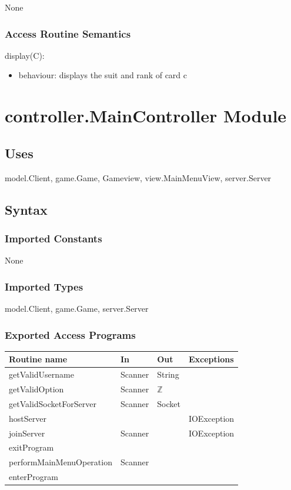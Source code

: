 \documentclass[12pt, titlepage]{article}
\begin{document}
None

\subsubsection* {Access Routine Semantics}

\noindent display(C):
\begin{itemize}
\item behaviour: displays the suit and rank of card c
\end{itemize}


\section* {controller.MainController Module}
    \subsection* {Uses}
        model.Client, game.Game, Gameview, view.MainMenuView, server.Server
    \subsection* {Syntax}
    
        \subsubsection* {Imported Constants}
            None
        \subsubsection* {Imported Types}
            model.Client, game.Game, server.Server
        \subsubsection* {Exported Access Programs}
        
        \begin{tabular}{| l | l | l | p{5cm} |}
            \hline
            \textbf{Routine name} & \textbf{In} & \textbf{Out} & \textbf{Exceptions}\\
            \hline
            getValidUsername & Scanner & String &\\
            \hline
            getValidOption & Scanner & $\mathbb{Z}$ &\\
            \hline 
            getValidSocketForServer & Scanner & Socket &\\
            \hline 
            hostServer & & & IOException\\
            \hline 
            joinServer & Scanner & & IOException\\
            \hline 
            exitProgram & & &\\
            \hline 
            performMainMenuOperation & Scanner & &\\
            \hline 
            enterProgram & & &\\
            \hline 
        \end{tabular}
        
\end{document}
